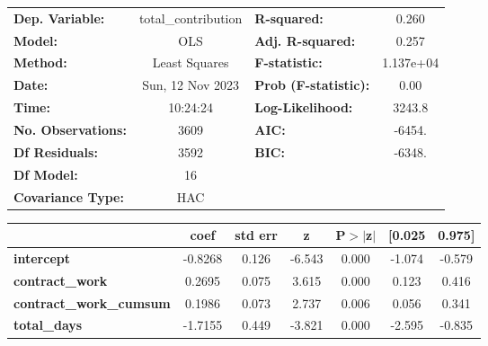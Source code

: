 \begin{center}
\begin{tabular}{lclc}
\toprule
\textbf{Dep. Variable:}                  & total\_contribution & \textbf{  R-squared:         } &     0.260   \\
\textbf{Model:}                          &         OLS         & \textbf{  Adj. R-squared:    } &     0.257   \\
\textbf{Method:}                         &    Least Squares    & \textbf{  F-statistic:       } & 1.137e+04   \\
\textbf{Date:}                           &   Sun, 12 Nov 2023  & \textbf{  Prob (F-statistic):} &     0.00    \\
\textbf{Time:}                           &       10:24:24      & \textbf{  Log-Likelihood:    } &    3243.8   \\
\textbf{No. Observations:}               &          3609       & \textbf{  AIC:               } &    -6454.   \\
\textbf{Df Residuals:}                   &          3592       & \textbf{  BIC:               } &    -6348.   \\
\textbf{Df Model:}                       &            16       & \textbf{                     } &             \\
\textbf{Covariance Type:}                &         HAC         & \textbf{                     } &             \\
\bottomrule
\end{tabular}
\begin{tabular}{lcccccc}
                                         & \textbf{coef} & \textbf{std err} & \textbf{z} & \textbf{P$> |$z$|$} & \textbf{[0.025} & \textbf{0.975]}  \\
\midrule
\textbf{intercept}                       &      -0.8268  &        0.126     &    -6.543  &         0.000        &       -1.074    &       -0.579     \\
\textbf{contract\_work}                  &       0.2695  &        0.075     &     3.615  &         0.000        &        0.123    &        0.416     \\
\textbf{contract\_work\_cumsum}          &       0.1986  &        0.073     &     2.737  &         0.006        &        0.056    &        0.341     \\
\textbf{total\_days}                     &      -1.7155  &        0.449     &    -3.821  &         0.000        &       -2.595    &       -0.835     \\

\end{tabular}
\end{center}
